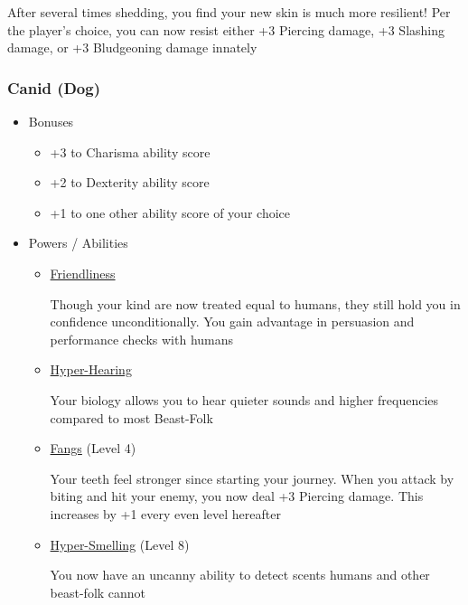 \documentclass[12pt, landscape]{article}
\begin{document}
\begin{FlushLeft}
\begin{multicols}{2}
\begin{itemize}
\begin{itemize}
					After several times shedding, you find your new skin is much more resilient! Per the player’s choice, you can now resist either +3 Piercing damage, +3 Slashing damage, or +3 Bludgeoning damage innately
				\end{itemize}
			\end{itemize}
			\vfill \pagebreak

			\subsubsection{Canid (Dog)}
			\begin{itemize}
				\item Bonuses
				\begin{itemize}
					\item +3 to Charisma ability score
					\item +2 to Dexterity ability score
					\item +1 to one other ability score of your choice
				\end{itemize}
				\item Powers / Abilities
				\begin{itemize}
					\item \underline{Friendliness}

					Though your kind are now treated equal to humans, they still hold you in confidence unconditionally. You gain advantage in persuasion and performance checks with humans
					\item \underline{Hyper-Hearing}

					Your biology allows you to hear quieter sounds and higher frequencies compared to most Beast-Folk
					\item \underline{Fangs} (Level 4)

					Your teeth feel stronger since starting your journey. When you attack by biting and hit your enemy, you now deal +3 Piercing damage. This increases by +1 every even level hereafter
					\item \underline{Hyper-Smelling} (Level 8)

					You now have an uncanny ability to detect scents humans and other beast-folk cannot
				\end{itemize}
			\end{itemize}
			\vfill \null \columnbreak


\end{multicols}
\end{FlushLeft}
\end{document}

